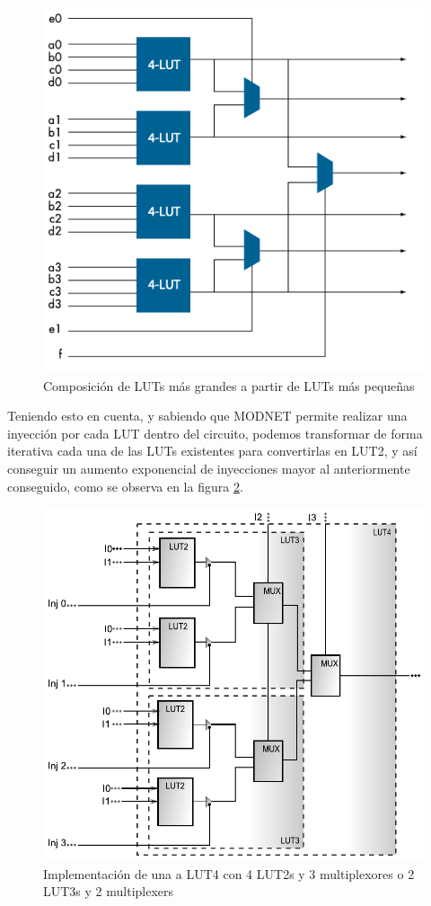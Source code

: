 \begin{figure}[H]
	\centering
	\includegraphics[width=0.6 \textwidth]{img/altera_luts_2.png}
	\caption{Composición de LUTs más grandes a partir de LUTs más pequeñas}
	\label{altera_luts_2}
\end{figure}

Teniendo esto en cuenta, y sabiendo que MODNET permite realizar una inyección por cada LUT dentro del circuito, podemos transformar de forma iterativa cada una de las LUTs existentes para convertirlas en LUT2, y así conseguir un aumento exponencial de inyecciones mayor al anteriormente conseguido, como se observa en la figura \ref{lut4_to_lut2}.

\begin{figure}[t]
	\centering
	\includegraphics[width=0.7 \textwidth]{img/Lut4_IN_LUT2.pdf}
	\caption{Implementación de una a LUT4 con 4 LUT2s y 3 multiplexores o 2 LUT3s y 2 multiplexers}
	\label{lut4_to_lut2}
\end{figure}